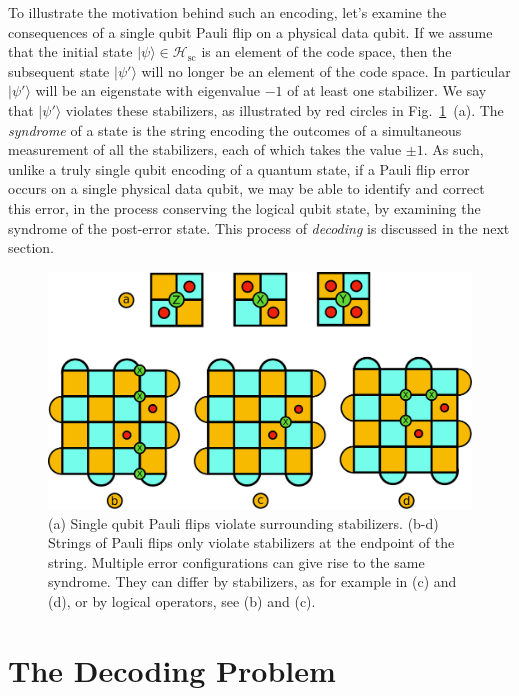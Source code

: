 \documentclass[twocolumn,preprintnumbers,amsmath,amssymb,notitlepage,nofootinbib,longbibliography,superscriptaddress,aps,pra,10pt]{revtex4-1}
\begin{document}
        To illustrate the motivation behind such an encoding, let's examine the consequences of a single qubit Pauli flip on a physical data qubit. 
        If we assume that the initial state $|\psi\rangle \in \mathcal{H}_\mathrm{sc}$ is an element of the code space, then the subsequent state $|\psi'\rangle$ will no longer be an element of the code space.
        In particular $|\psi'\rangle$ will be an eigenstate with eigenvalue $-1$ of at least one stabilizer. 
        We say that $|\psi'\rangle$ violates these stabilizers, as illustrated by red circles in Fig.~\ref{f:surface_code_examples}~(a).
        The \textit{syndrome} of a state is the string encoding the outcomes of a simultaneous measurement of all the stabilizers, each of which takes the value $\pm 1$.
        As such, unlike a truly single qubit encoding of a quantum state, if a Pauli flip error occurs on a single physical data qubit, we may be able to identify and correct this error, in the process conserving the logical qubit state, by examining the syndrome of the post-error state. 
        This process of \textit{decoding} is discussed in the next section.

        \begin{figure}
            \centering
            \includegraphics[width=1\linewidth]{figures/surface_code_examples.pdf}
            \caption{(a) Single qubit Pauli flips violate surrounding stabilizers. (b-d) Strings of Pauli flips only violate stabilizers at the endpoint of the string. Multiple error configurations can give rise to the same syndrome. They can differ by stabilizers, as for example in (c) and (d), or by logical operators, see (b) and (c).}\label{f:surface_code_examples}
        \end{figure}


\section{The Decoding Problem}\label{s:the_decoding_problem}
\end{document}
